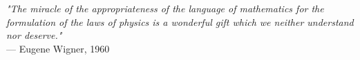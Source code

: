 \begin{flushright}
\emph{"The miracle of the appropriateness of the language of mathematics for the formulation of the laws of physics is a wonderful gift which we neither understand nor deserve."}\\
--- Eugene Wigner, 1960
\end{flushright}
